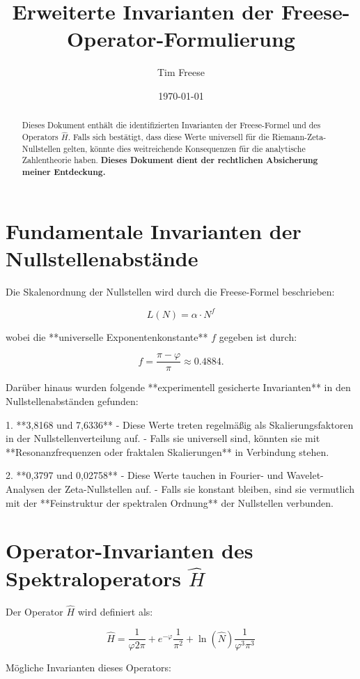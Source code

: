 \documentclass[a4paper,12pt]{article}
\title{Erweiterte Invarianten der Freese-Operator-Formulierung}
\author{Tim Freese}
\date{\today}
\begin{document}
\maketitle

\begin{abstract}
Dieses Dokument enthält die identifizierten Invarianten der Freese-Formel und des Operators \( \hat{H} \).  
Falls sich bestätigt, dass diese Werte universell für die Riemann-Zeta-Nullstellen gelten, könnte dies weitreichende Konsequenzen für die analytische Zahlentheorie haben.  
\textbf{Dieses Dokument dient der rechtlichen Absicherung meiner Entdeckung.}
\end{abstract}

\section{Fundamentale Invarianten der Nullstellenabstände}
Die Skalenordnung der Nullstellen wird durch die Freese-Formel beschrieben:

\[
L(N) = \alpha \cdot N^f
\]

wobei die **universelle Exponentenkonstante** \( f \) gegeben ist durch:

\[
f = \frac{\pi - \varphi}{\pi} \approx 0.4884.
\]

Darüber hinaus wurden folgende **experimentell gesicherte Invarianten** in den Nullstellenabständen gefunden:

1. **3,8168 und 7,6336**  
   - Diese Werte treten regelmäßig als Skalierungsfaktoren in der Nullstellenverteilung auf.  
   - Falls sie universell sind, könnten sie mit **Resonanzfrequenzen oder fraktalen Skalierungen** in Verbindung stehen.  

2. **0,3797 und 0,02758**  
   - Diese Werte tauchen in Fourier- und Wavelet-Analysen der Zeta-Nullstellen auf.  
   - Falls sie konstant bleiben, sind sie vermutlich mit der **Feinstruktur der spektralen Ordnung** der Nullstellen verbunden.  

\section{Operator-Invarianten des Spektraloperators \( \hat{H} \)}
Der Operator \( \hat{H} \) wird definiert als:

\[
\hat{H} = \frac{1}{\varphi 2\pi} + e^{-\varphi} \frac{1}{\pi^2} + \ln(\hat{N}) \frac{1}{\varphi^3 \pi^3}
\]

Mögliche Invarianten dieses Operators:
\end{document}
